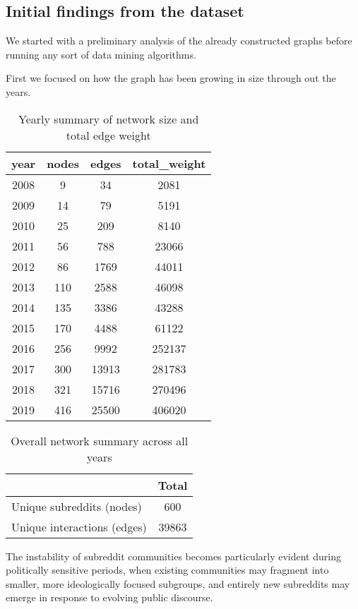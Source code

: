 \documentclass{article}
\begin{document}
\subsection{Initial findings from the dataset}

We started with a preliminary analysis of the already constructed graphs before running any sort of data mining algorithms.

First we focused on how the graph has been growing in size through out the years.

\begin{table}[h]
\centering
\begin{tabular}[]{cccc}
\hline
year & nodes & edges & total\_weight \\
\hline
2008 & 9   & 34    & 2081     \\
2009 & 14  & 79    & 5191     \\
2010 & 25  & 209   & 8140     \\
2011 & 56  & 788   & 23066    \\
2012 & 86  & 1769  & 44011    \\
2013 & 110 & 2588  & 46098    \\
2014 & 135 & 3386  & 43288    \\
2015 & 170 & 4488  & 61122    \\
2016 & 256 & 9992  & 252137   \\
2017 & 300 & 13913 & 281783   \\
2018 & 321 & 15716 & 270496   \\
2019 & 416 & 25500 & 406020   \\
\hline
\end{tabular}
\vspace{10pt}
\caption{Yearly summary of network size and total edge weight}
\end{table}%

\begin{table}[h]
\centering
\begin{tabular}{lc}
\hline
 & Total \\
\hline
Unique subreddits (nodes) & 600 \\
Unique interactions (edges) & 39863 \\
\hline
\end{tabular}
\vspace{10pt}
\caption{Overall network summary across all years}
\end{table}%

The instability of subreddit communities becomes particularly evident during politically sensitive periods, when existing communities may fragment into smaller, more ideologically focused subgroups, and entirely new subreddits may emerge in response to evolving public discourse.
\end{document}
